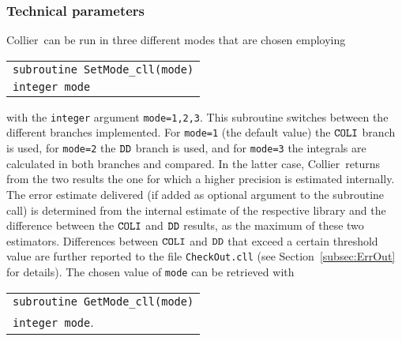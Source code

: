 \documentclass[preprint,sort&compress,12pt]{elsarticle}
\makeatletter
\def\bce{\begin{center}}
\def\ece{\end{center}}
\def\refse#1{\mbox{Section~\ref{#1}}}
\newcommand{\collier}{{\sc Collier}}
\newlength{\parwidth}\newlength{\colonewidth}%
\newcommand{\cpcsub}[1]
{%
\setlength{\parwidth}{\textwidth}\addtolength{\parwidth}{-2.1em}%
\bce
\begin{tabular}[t]{@{}p{\parwidth}@{}}
#1
\end{tabular}
\ece
}%
\makeatother
\begin{document}
\subsubsection{Technical parameters}
\label{suse:tecpa}
\collier\ can be run in three different modes that are chosen employing
\cpcsub{
{\tt subroutine  SetMode\_cll(mode)} \\
{\tt integer mode} \\
}
with the {\tt integer} argument {\tt mode=1,2,3}. This subroutine
switches between the different branches implemented.  For {\tt mode=1}
(the default value) the $\tt COLI$ branch is used, for {\tt mode=2}
the $\tt DD$ branch is used, and for {\tt mode=3} the integrals are
calculated in both branches and compared. In the latter case, \collier\ 
returns from the two results the one for which a higher precision is
estimated internally. The error estimate delivered 
(if added as optional argument to the subroutine call)
is determined from the internal estimate of the respective library and
the difference between the $\tt COLI$ and $\tt DD$ results, as the
maximum of these two estimators. Differences between $\tt COLI$ and
$\tt DD$ that exceed a certain threshold value are further reported to
the file {\tt CheckOut.cll} (see \refse{subsec:ErrOut} for details).
The chosen value of {\tt mode} can be retrieved with
\cpcsub{
{\tt subroutine  GetMode\_cll(mode)}\\
{\tt integer mode}\;. \\
}
\end{document}
